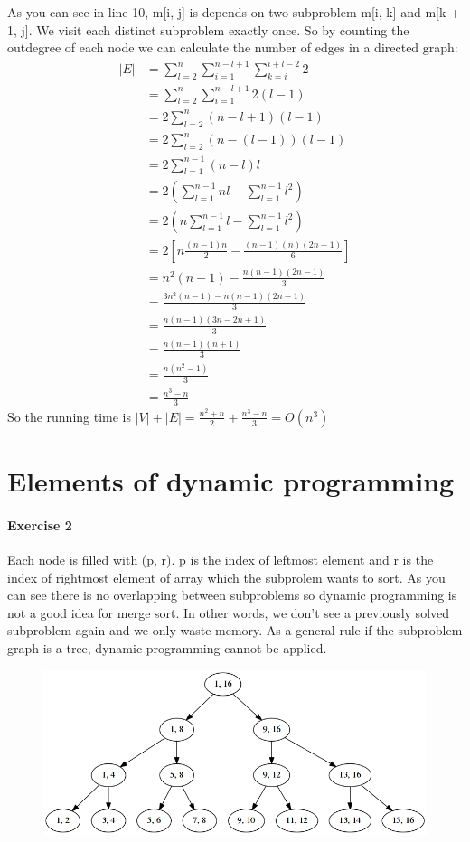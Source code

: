 \documentclass{book}
\begin{document}
	As you can see in line 10, m[i, j] is depends on two subproblem m[i, k] and m[k + 1, j]. We visit each distinct subproblem exactly once. So by counting the outdegree of each node we can calculate the number of edges in a directed graph:
	\begin{equation}
	\begin{split}
	|E| &= \sum_{l = 2}^{n}\sum_{i=1}^{n - l + 1}\sum_{k = i}^{i+l-2}2 \\
	&= \sum_{l=2}^{n}\sum_{i=1}^{n-l+1}2(l-1) \\
	&= 2\sum_{l=2}^{n}(n - l + 1)(l-1) \\
	&= 2\sum_{l=2}^{n}(n -(l - 1))(l-1) \\
	&= 2\sum_{l=1}^{n-1}(n-l)l \\
	&= 2(\sum_{l=1}^{n-1}nl - \sum_{l=1}^{n-1}l^2) \\
	&= 2(n\sum_{l=1}^{n-1}l - \sum_{l=1}^{n-1}l^2) \\
	&= 2[n\frac{(n - 1)n}{2} - \frac{(n - 1)(n)(2n - 1)}{6}] \\
	&= n^2(n - 1) - \frac{n(n-1)(2n-1)}{3} \\
	&= \frac{3n^2(n-1)-n(n-1)(2n-1)}{3} \\
	&= \frac{n(n-1)(3n-2n+1)}{3} \\
	&= \frac{n(n-1)(n+1)}{3}\\
	&= \frac{n(n^2-1)}{3}\\
	&= \frac{n^3 - n}{3}
	\end{split}
	\end{equation}
	So the running time is $|V| + |E| = \frac{n^2 + n}{2} + \frac{n^3 - n}{3} = O(n^3)$
	\section{Elements of dynamic programming}
	\paragraph{Exercise 2}
	Each node is filled with (p, r). p is the index of leftmost element and r is the index of rightmost element of array which the subprolem wants to sort. As you can see there is no overlapping between subproblems so dynamic programming is not a good idea for merge sort. In other words, we don't see a previously solved subproblem again and we only waste memory. As a general rule if the subproblem graph is a tree, dynamic programming cannot be applied.
	\begin{figure}[h!]
		\includegraphics[width=\linewidth]{images/15/15-3-2.png}
	\end{figure}
\end{document}
